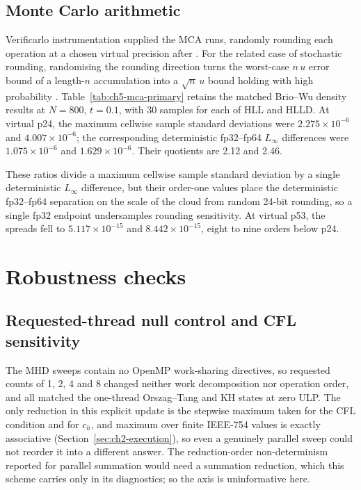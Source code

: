 \subsection{Monte Carlo arithmetic}
\label{sec:ch5-mca}

Verificarlo instrumentation \citep{denisEtAl2016verificarlo} supplied the MCA
runs, randomly rounding each operation at a chosen virtual precision after
\citet{parker1997mca}. For the related case of stochastic rounding, randomising
the rounding direction turns the worst-case $n\,u$ error bound of a
length-$n$ accumulation into a $\sqrt{n}\,u$ bound holding with high
probability \citep{crociEtAl2022stochastic}.
Table~\ref{tab:ch5-mca-primary} retains the matched Brio--Wu density
results at $N=800$, $t=0.1$, with 30 samples for each of HLL and HLLD. At
virtual p24, the maximum cellwise sample standard deviations were
$2.275\times10^{-6}$ and $4.007\times10^{-6}$; the corresponding deterministic
fp32--fp64 $L_\infty$ differences were $1.075\times10^{-6}$ and
$1.629\times10^{-6}$. Their quotients are 2.12 and 2.46.

These ratios divide a maximum cellwise sample standard deviation by a single
deterministic $L_\infty$ difference, but their order-one values place the
deterministic fp32--fp64 separation on the scale of the cloud from random
24-bit rounding, so a single fp32 endpoint undersamples rounding sensitivity.
At virtual p53, the spreads fell to $5.117\times10^{-15}$ and
$8.442\times10^{-15}$, eight to nine orders below p24.



\section{Robustness checks}
\label{sec:ch5-robustness}

\subsection{Requested-thread null control and CFL sensitivity}
\label{sec:ch5-thread-cfl}

The MHD sweeps contain no OpenMP work-sharing directives, so requested counts
of 1, 2, 4 and 8 changed neither work decomposition nor operation order, and
all matched the one-thread Orszag--Tang and KH states at zero ULP. The only
reduction in this explicit update is the stepwise maximum taken for the CFL
condition and for
$c_h$, and maximum over finite IEEE-754 values is exactly associative
(Section~\ref{sec:ch2-execution}), so even a genuinely parallel sweep could not
reorder it into a different answer. The reduction-order non-determinism
reported for parallel summation \citep{collangeEtAl2015reduction} would need a
summation reduction, which this scheme carries only in its diagnostics; so the
axis is uninformative here.

